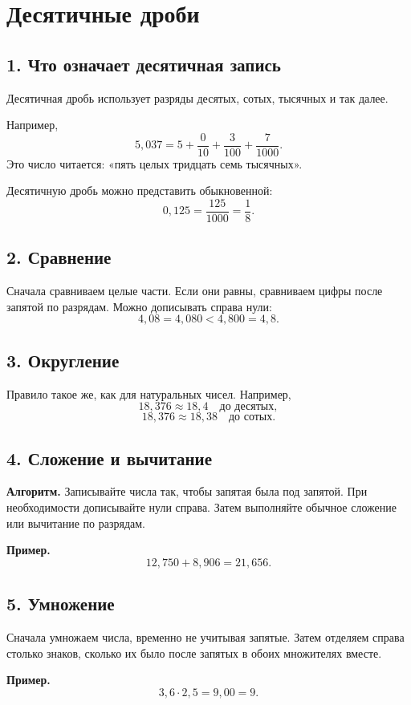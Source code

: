 \documentclass[12pt,a4paper]{article}
\newcommand{\algorithm}[1]{%
  \par\smallskip
  {\color{accent}\textbf{Алгоритм.}} #1\par\smallskip
}
\begin{document}
\newpage

\section{Десятичные дроби}

\subsection*{1. Что означает десятичная запись}
Десятичная дробь использует разряды десятых, сотых, тысячных и так далее.

Например,
\[
5{,}037=5+\frac{0}{10}+\frac3{100}+\frac7{1000}.
\]
Это число читается: «пять целых тридцать семь тысячных».

Десятичную дробь можно представить обыкновенной:
\[
0{,}125=\frac{125}{1000}=\frac18.
\]

\subsection*{2. Сравнение}
Сначала сравниваем целые части. Если они равны, сравниваем цифры после запятой по разрядам. Можно дописывать справа нули:
\[
4{,}08=4{,}080<4{,}800=4{,}8.
\]

\subsection*{3. Округление}
Правило такое же, как для натуральных чисел. Например,
\[
18{,}376\approx18{,}4\quad\text{до десятых},
\]
\[
18{,}376\approx18{,}38\quad\text{до сотых}.
\]

\subsection*{4. Сложение и вычитание}
\algorithm{Записывайте числа так, чтобы запятая была под запятой. При необходимости дописывайте нули справа. Затем выполняйте обычное сложение или вычитание по разрядам.}

\textbf{Пример.}
\[
12{,}750+8{,}906=21{,}656.
\]

\subsection*{5. Умножение}
Сначала умножаем числа, временно не учитывая запятые. Затем отделяем справа столько знаков, сколько их было после запятых в обоих множителях вместе.

\textbf{Пример.}
\[
3{,}6\cdot2{,}5=9{,}00=9.
\]
\end{document}
